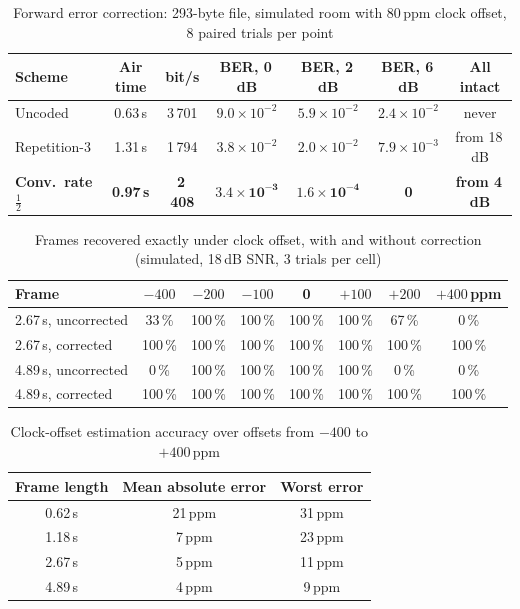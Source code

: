 \documentclass[11pt,a4paper]{report}
\begin{document}
\label{sec:fec}
\begin{table}[htbp]
\centering
\footnotesize
\begin{tabular}{|l|c|c|c|c|c|c|}
\hline
\textbf{Scheme} & \textbf{Air time} & \textbf{bit/s} & \textbf{BER, 0\,dB} & \textbf{BER, 2\,dB} & \textbf{BER, 6\,dB} & \textbf{All intact} \\
\hline
Uncoded & 0.63\,s & 3\,701 & $9.0\times10^{-2}$ & $5.9\times10^{-2}$ & $2.4\times10^{-2}$ & never \\
Repetition-3 & 1.31\,s & 1\,794 & $3.8\times10^{-2}$ & $2.0\times10^{-2}$ & $7.9\times10^{-3}$ & from 18\,dB \\
\textbf{Conv.\ rate $\tfrac12$} & \textbf{0.97\,s} & \textbf{2\,408} & $\mathbf{3.4\times10^{-3}}$ & $\mathbf{1.6\times10^{-4}}$ & \textbf{0} & \textbf{from 4\,dB} \\
\hline
\end{tabular}
\caption{Forward error correction: 293-byte file, simulated room with 80\,ppm clock
offset, 8 paired trials per point}
\end{table}

\begin{table}[htbp]
\centering
\small
\begin{tabular}{|l|c|c|c|c|c|c|c|}
\hline
\textbf{Frame} & $-400$ & $-200$ & $-100$ & 0 & $+100$ & $+200$ & $+400$\,ppm \\
\hline
2.67\,s, uncorrected & 33\,\% & 100\,\% & 100\,\% & 100\,\% & 100\,\% & 67\,\% & 0\,\% \\
2.67\,s, corrected & 100\,\% & 100\,\% & 100\,\% & 100\,\% & 100\,\% & 100\,\% & 100\,\% \\
4.89\,s, uncorrected & 0\,\% & 100\,\% & 100\,\% & 100\,\% & 100\,\% & 0\,\% & 0\,\% \\
4.89\,s, corrected & 100\,\% & 100\,\% & 100\,\% & 100\,\% & 100\,\% & 100\,\% & 100\,\% \\
\hline
\end{tabular}
\caption{Frames recovered exactly under clock offset, with and without correction
(simulated, 18\,dB SNR, 3 trials per cell)}
\end{table}

\begin{table}[htbp]
\centering
\small
\begin{tabular}{|c|c|c|}
\hline
\textbf{Frame length} & \textbf{Mean absolute error} & \textbf{Worst error} \\
\hline
0.62\,s & 21\,ppm & 31\,ppm \\
1.18\,s & 7\,ppm & 23\,ppm \\
2.67\,s & 5\,ppm & 11\,ppm \\
4.89\,s & 4\,ppm & 9\,ppm \\
\hline
\end{tabular}
\caption{Clock-offset estimation accuracy over offsets from $-400$ to $+400$\,ppm}
\end{table}
\end{document}
